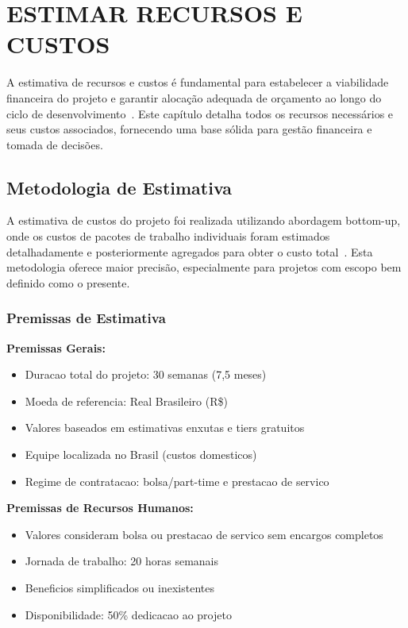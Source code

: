 \chapter{ESTIMAR RECURSOS E CUSTOS}

A estimativa de recursos e custos é fundamental para estabelecer a viabilidade financeira do projeto e garantir alocação adequada de orçamento ao longo do ciclo de desenvolvimento~\cite{PMI:2021, Kerzner:2022}. Este capítulo detalha todos os recursos necessários e seus custos associados, fornecendo uma base sólida para gestão financeira e tomada de decisões.

\section{Metodologia de Estimativa}

A estimativa de custos do projeto foi realizada utilizando abordagem bottom-up, onde os custos de pacotes de trabalho individuais foram estimados detalhadamente e posteriormente agregados para obter o custo total~\cite{PMI:2021}. Esta metodologia oferece maior precisão, especialmente para projetos com escopo bem definido como o presente.

\subsection{Premissas de Estimativa}

\textbf{Premissas Gerais:}
\begin{itemize}
    \item Duracao total do projeto: 30 semanas (7,5 meses)
    \item Moeda de referencia: Real Brasileiro (R\$)
    \item Valores baseados em estimativas enxutas e tiers gratuitos
    \item Equipe localizada no Brasil (custos domesticos)
    \item Regime de contratacao: bolsa/part-time e prestacao de servico
\end{itemize}

\textbf{Premissas de Recursos Humanos:}
\begin{itemize}
    \item Valores consideram bolsa ou prestacao de servico sem encargos completos
    \item Jornada de trabalho: 20 horas semanais
    \item Beneficios simplificados ou inexistentes
    \item Disponibilidade: 50\% dedicacao ao projeto
\end{itemize}

